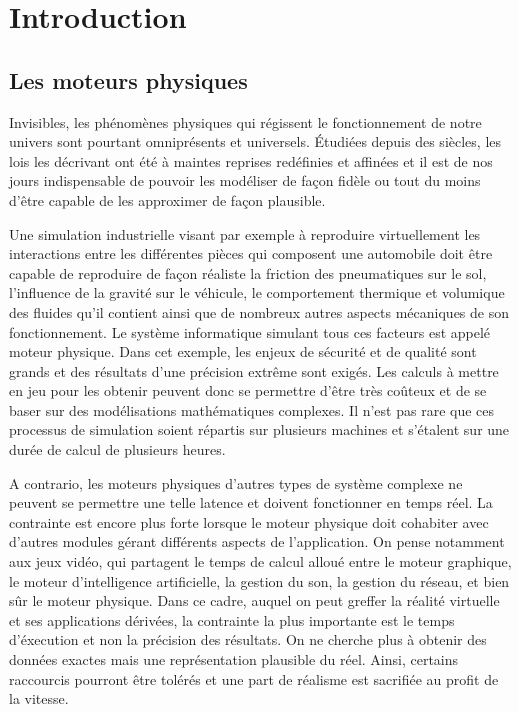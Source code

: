\section{Introduction}

\subsection{Les moteurs physiques}

Invisibles, les phénomènes physiques qui régissent le fonctionnement
de notre univers sont pourtant omniprésents et universels. \'Etudiées
depuis des siècles, les lois les décrivant ont été à maintes reprises
redéfinies et affinées et il est de nos jours indispensable de pouvoir
les modéliser de façon fidèle ou tout du moins d'être capable de les
approximer de façon plausible.

Une simulation industrielle visant par exemple à reproduire
virtuellement les interactions entre les différentes pièces qui
composent une automobile doit être capable de reproduire de façon
réaliste la friction des pneumatiques sur le sol, l'influence de la
gravité sur le véhicule, le comportement thermique et volumique des
fluides qu'il contient ainsi que de nombreux autres aspects mécaniques
de son fonctionnement. Le système informatique simulant tous ces
facteurs est appelé moteur physique. Dans cet exemple, les enjeux de
sécurité et de qualité sont grands et des résultats d'une précision
extrême sont exigés. Les calculs à mettre en jeu pour les obtenir
peuvent donc se permettre d'être très coûteux et de se baser sur des
modélisations mathématiques complexes. Il n'est pas rare que ces
processus de simulation soient répartis sur plusieurs machines et
s'étalent sur une durée de calcul de plusieurs heures.

A contrario, les moteurs physiques d'autres types de système complexe
ne peuvent se permettre une telle latence et doivent fonctionner en
temps réel. La contrainte est encore plus forte lorsque le moteur
physique doit cohabiter avec d'autres modules gérant différents
aspects de l'application. On pense notamment aux jeux vidéo, qui
partagent le temps de calcul alloué entre le moteur graphique, le
moteur d'intelligence artificielle, la gestion du son, la gestion du
réseau, et bien sûr le moteur physique. Dans ce cadre, auquel on peut
greffer la réalité virtuelle et ses applications dérivées, la
contrainte la plus importante est le temps d'éxecution et non la
précision des résultats. On ne cherche plus à obtenir des données
exactes mais une représentation plausible du réel. Ainsi, certains
raccourcis pourront être tolérés et une part de réalisme est sacrifiée
au profit de la vitesse.

